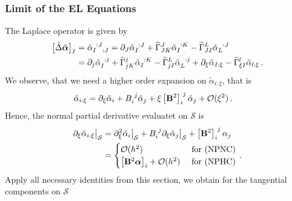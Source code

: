 \documentclass[a4paper,10pt]{scrartcl}
\newcommand{\surf}{\mathcal{S}}
\newcommand{\landau}{\mathcal{O}}
\newcommand{\Bb}{\mathbf{B}}
\newcommand{\alphab}{\bm{\alpha}}
\newcommand{\talphab}{\tilde{\alphab}}
\newcommand{\talpha}{\tilde{\alpha}}
\newcommand{\tlaplace}{\tilde{\Delta}}
\newcommand{\tch}[2]{\widetilde{\Gamma}_{#1}^{#2}}
\newcommand{\formPeriod}{\,\text{.}}
\begin{document}
    \subsubsection{Limit of the EL Equations}
      The Laplace operator is given by
      \begin{align}
        \left[ \tlaplace\talphab \right]_{I}
            &= \tensor{\talpha}{_{I}^{:J}_{:J}}
             = \partial_{J}\tensor{\talpha}{_{I}^{:J}} + \tch{JK}{J}\tensor{\talpha}{_{I}^{:K}} - \tch{JI}{L}\tensor{\talpha}{_{L}^{:J}} \\
            &= \partial_{j}\tensor{\talpha}{_{I}^{:j}} + \tch{jK}{j}\tensor{\talpha}{_{I}^{:K}} - \tch{jI}{L}\tensor{\talpha}{_{L}^{:j}}
                +\partial_{\xi}\talpha_{I:\xi} - \tch{\xi I}{l}\talpha_{l:\xi}\formPeriod
      \end{align}
      We observe, that we need a higher order expansion on \( \talpha_{i:\xi} \), that is
      \begin{align}
        \talpha_{i:\xi} &= \partial_{\xi}\talpha_{i} + \tensor{B}{_{i}^{j}}\talpha_{j} + \xi\tensor{\left[ \Bb^{2} \right]}{_{i}^{j}}\talpha_{j} +\landau(\xi^{2})\formPeriod
      \end{align}
      Hence, the normal partial derivative evaluatet on \( \surf \) is
      \begin{align}
        \partial_{\xi}\talpha_{i:\xi}\big|_{\surf} &= \partial_{\xi}^{2} \talpha_{i}\big|_{\surf} 
                            + \tensor{B}{_{i}^{j}}\partial_{\xi}\talpha_{j}\big|_{\surf}
                            + \tensor{\left[ \Bb^{2} \right]}{_{i}^{j}}\alpha_{j}\\
               &=
                  \begin{cases}
                    \landau(h^{2}) & \text{ for (NPNC)} \\
                    \left[ \Bb^{2}\alphab \right]_{i} + \landau(h^{2}) & \text{ for (NPHC)}
                  \end{cases} \formPeriod
      \end{align}
      Apply all necessary identities from this section, we obtain for the tangential components on \( \surf \)
\end{document}
